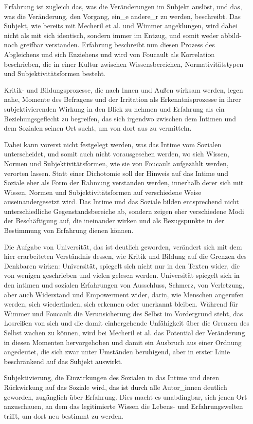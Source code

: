 Erfahrung ist zugleich das, was die Veränderungen im Subjekt
auslöst, und das, was die Veränderung, den Vorgang, ein\_e andere\_r zu werden,
beschreibt. Das Subjekt, wie bereits mit Mecheril et al. und Wimmer
angeklungen, wird dabei nicht als mit sich identisch, sondern immer im Entzug,
und somit weder abbild- noch greifbar verstanden. Erfahrung beschreibt nun
diesen Prozess des Abgleichens und sich Enziehens und wird von Foucault als
Korrelation beschrieben, die \glqq in einer Kultur zwischen Wissensbereichen,
Normativitätstypen und Subjektivitätsformen\grqq\footnotemark
{} besteht. 

Kritik- und
Bildungsprozesse, die nach Innen und Außen wirksam werden, legen nahe, Momente
des Befragens und der Irritation als Erkenntnisprozesse in ihrer
subjektivierenden Wirkung in den Blick zu nehmen und Erfahrung als ein
Beziehungsgeflecht zu begreifen, das sich irgendwo zwischen dem Intimen und dem
Sozialen seinen Ort sucht, um von dort aus zu vermitteln.

Dabei kann vorerst
nicht festgelegt werden, was das Intime vom Sozialen unterscheidet, und somit
auch nicht vorausgesehen werden, wo sich Wissen, Normen und
Subjektivitätsformen, wie sie von Foucault aufgezählt werden, verorten lassen.
Statt einer Dichotomie soll der Hinweis auf das Intime und Soziale eher als
Form der Rahmung verstanden werden, innerhalb derer sich mit Wissen, Normen und
Subjektivitätsformen auf verschiedene Weise auseinandergesetzt wird. Das Intime
und das Soziale bilden entsprechend nicht unterschiedliche Gegenstandsbereiche
ab, sondern zeigen eher verschiedene Modi der Beschäftigung auf, die ineinander
wirken und als Bezugspunkte in der Bestimmung von Erfahrung dienen können. 
 
Die Aufgabe von Universität, das ist deutlich geworden, verändert sich mit dem
hier erarbeiteten Verständnis dessen, wie Kritik und Bildung auf die Grenzen
des Denkbaren wirken: Universität, spiegelt sich nicht nur in den Texten wider,
die von wenigen geschrieben und vielen gelesen werden. Universität spiegelt
sich in den intimen und sozialen Erfahrungen von Ausschluss, Schmerz, von
Verletzung, aber auch Widerstand und Empowerment wider, darin, wie Menschen
angerufen werden, sich wiederfinden, sich erkennen oder unerkannt bleiben.
Während für Wimmer und Foucault die Verunsicherung des Selbst im Vordergrund
steht, das Losreißen von sich und die damit einhergehende Unfähigkeit über die
Grenzen des Selbst wachen zu können, wird bei Mecheril et al. das Potential der
Veränderung in diesen Momenten hervorgehoben und damit ein Ausbruch aus einer
Ordnung angedeutet, die sich zwar unter Umständen beruhigend, aber in erster
Linie beschränkend auf das Subjekt auswirkt. 

Subjektivierung, die Einwirkungen
des Sozialen in das Intime und deren Rückwirkung auf das Soziale wird, das ist
durch alle Autor\_innen deutlich geworden, zugänglich über Erfahrung. Dies macht
es unabdingbar, sich jenen Ort anzuschauen, an dem das legitimierte Wissen die
Lebens- und Erfahrungswelten trifft, um dort neu bestimmt zu werden.
